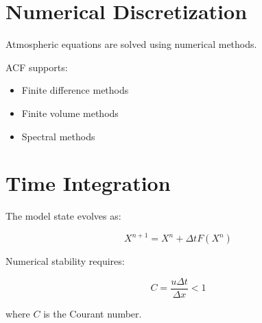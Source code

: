 \section{Numerical Discretization}


Atmospheric equations are solved using numerical methods.



ACF supports:


\begin{itemize}

\item Finite difference methods

\item Finite volume methods

\item Spectral methods

\end{itemize}



\section{Time Integration}


The model state evolves as:


\begin{equation}
X^{n+1}=X^n+\Delta t F(X^n)
\end{equation}



Numerical stability requires:


\begin{equation}
C=\frac{u\Delta t}{\Delta x}<1
\end{equation}


where $C$ is the Courant number.
